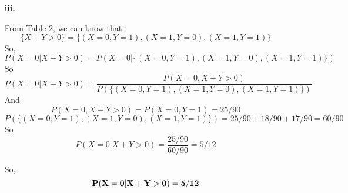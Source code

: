 \begin{enumerate}
\begin{enumerate}
\begin{enumerate}
{\bf Reason}: According to Table 3: 
	\begin{table}[H]
		\centering
		\begin{tabular}{|c|c|c|c|c|}
			\hline 
			& \multicolumn{2}{|c|}{$Z = 0$} & \multicolumn{2}{|c|}{ $Z = 1$}  \\ 
			\hline 
			& $X = 0$ & $X = 1$ & $X = 0$ & $X = 1$ \\ 
			\hline 
			$Y = 0$ & $1/15$ &   $1/15$ &  $4/15$ &  $2/15$  \\ 
			$Y = 1$ & $1/10$ &   $1/10$ &  $8/45$ &  $4/45$  \\ 
			\hline 
		\end{tabular}
		\caption{Table for (X, Y) Distribution \label{table:llltu}}
	\end{table}

We can get that: \\
$P(Z=0) = 30/90$, $P(X=0|Z=0) = 15/30$, $P(X=1|Z=0) = 15/30$, $P(Y=0|Z=0) = 12/30$, $P(Y=1|Z=0) = 18/30$,\\

So, $${\bf P(X, Y |Z=0) = P(X|Z=0)P(Y|Z=0)}$$\\


Similarly,\\
$P(Z=1) = 60/90$, $P(X=0|Z=1) = 40/60$, $P(X=1|Z=1) = 20/60$, $P(Y=0|Z=1) = 36/60$, $P(Y=1|Z=1) = 24/60$, \\
So, $${\bf P(X, Y |Z=1) = P(X|Z=1)P(Y|Z=1)}$$\\

In conclusion, {\bf X is conditionally independent of Y given Z}.\\

\item[{\bf iii. }]

From Table 2, we can know that: $$\{X + Y > 0\} = \{(X=0, Y=1), (X=1, Y=0), (X=1, Y=1)\}$$
So, 
$$P(X=0|X+Y>0) = P(X=0|\{(X=0, Y=1), (X=1, Y=0), (X=1, Y=1)\})$$
So $$P(X=0|X+Y>0) = \frac{P(X=0, X+Y>0)}{P(\{(X=0, Y=1), (X=1, Y=0), (X=1, Y=1)\})}$$
And\\
$$P(X=0, X+Y>0)=P(X=0, Y=1)=25/90$$
$$P(\{(X=0, Y=1), (X=1, Y=0), (X=1, Y=1)\}) = 25/90+18/90+17/90 = 60/90$$
So\\
$$P(X=0|X+Y>0) = \frac{25/90}{60/90} = 5/12$$

So, $${\bf P(X=0|X+Y>0) = 5/12}$$

\end{enumerate}

\end{enumerate}

\end{enumerate}



